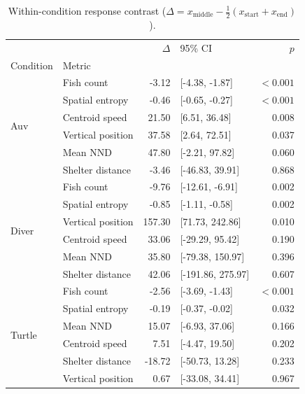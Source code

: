 \begin{table}
\caption{Within-condition response contrast ($\Delta = x_{\text{middle}} - \tfrac{1}{2}(x_{\text{start}} + x_{\text{end}})$).}
\label{tab:within_condition}
\begin{tabular}{llrlr}
\toprule
 &  & $\Delta$ & 95\% CI & $p$ \\
Condition & Metric &  &  &  \\
\midrule
\multirow[c]{6}{*}{Auv} & Fish count & -3.12 & [-4.38, -1.87] & $<0.001$ \\
 & Spatial entropy & -0.46 & [-0.65, -0.27] & $<0.001$ \\
 & Centroid speed & 21.50 & [6.51, 36.48] & 0.008 \\
 & Vertical position & 37.58 & [2.64, 72.51] & 0.037 \\
 & Mean NND & 47.80 & [-2.21, 97.82] & 0.060 \\
 & Shelter distance & -3.46 & [-46.83, 39.91] & 0.868 \\
\multirow[c]{6}{*}{Diver} & Fish count & -9.76 & [-12.61, -6.91] & 0.002 \\
 & Spatial entropy & -0.85 & [-1.11, -0.58] & 0.002 \\
 & Vertical position & 157.30 & [71.73, 242.86] & 0.010 \\
 & Centroid speed & 33.06 & [-29.29, 95.42] & 0.190 \\
 & Mean NND & 35.80 & [-79.38, 150.97] & 0.396 \\
 & Shelter distance & 42.06 & [-191.86, 275.97] & 0.607 \\
\multirow[c]{6}{*}{Turtle} & Fish count & -2.56 & [-3.69, -1.43] & $<0.001$ \\
 & Spatial entropy & -0.19 & [-0.37, -0.02] & 0.032 \\
 & Mean NND & 15.07 & [-6.93, 37.06] & 0.166 \\
 & Centroid speed & 7.51 & [-4.47, 19.50] & 0.202 \\
 & Shelter distance & -18.72 & [-50.73, 13.28] & 0.233 \\
 & Vertical position & 0.67 & [-33.08, 34.41] & 0.967 \\
\bottomrule
\end{tabular}
\end{table}
